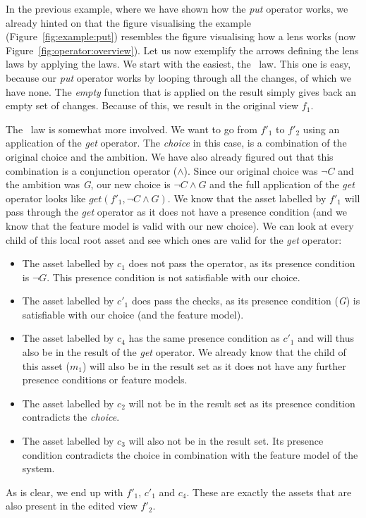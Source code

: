 \begin{example}
  In the previous example, where we have shown how the \emph{put} operator works,
  we already hinted on that the figure visualising the example (Figure~\ref{fig:example:put})
  resembles the figure visualising how a lens works (now Figure~\ref{fig:operator:overview}).
  Let us now exemplify the arrows defining the lens laws by applying the laws. We start with
  the easiest, the \getput~law. This one is easy, because our \emph{put} operator works by
  looping through all the changes, of which we have none. The \emph{empty} function that is
  applied on the result simply gives back an empty set of changes. Because of this, we result
  in the original view $f_1$. 

  The \putget~law is somewhat more involved. We want to go from $f'_1$ to $f'_2$ using an
  application of the \emph{get} operator. The \emph{choice} in this case, is a combination
  of the original choice and the ambition. We have also already figured out that this 
  combination is a conjunction operator (\(\land\)). Since our original choice was \( \neg\mathit{C} \)
  and the ambition was \emph{G}, our new choice is \(\neg\mathit{C} \land \mathit{G}\) and 
  the full application of the \emph{get} operator looks like
  \( \mathit{get}\left( f'_1, \neg\mathit{C} \land \mathit{G} \right) \).
  We know that the asset labelled by $f'_1$ will pass through the \emph{get} operator as
  it does not have a presence condition (and we know that the feature model is valid with
  our new choice). We can look at every child of this local root asset and see which ones
  are valid for the \emph{get} operator:
  \begin{itemize}
    \item The asset labelled by $c_1$ does not pass the operator, as its presence condition
          is \(\neg\mathit{G}\). This presence condition is not satisfiable with our choice.
    \item The asset labelled by $c'_1$ does pass the checks, as its presence condition (\emph{G})
          is satisfiable with our choice (and the feature model).
    \item The asset labelled by $c_4$ has the same presence condition as $c'_1$ and will thus also
          be in the result of the \emph{get} operator. We already know that the child of this asset
          ($m_1$) will also be in the result set as it does not have any further presence conditions
          or feature models.
    \item The asset labelled by $c_2$ will not be in the result set as its presence condition contradicts
          the \emph{choice}.
    \item The asset labelled by $c_3$ will also not be in the result set. Its presence condition
          contradicts the choice in combination with the feature model of the system.
  \end{itemize}
  As is clear, we end up with $f'_1$, $c'_1$ and $c_4$. These are exactly the assets that are also
  present in the edited view $f'_2$.
\end{example}